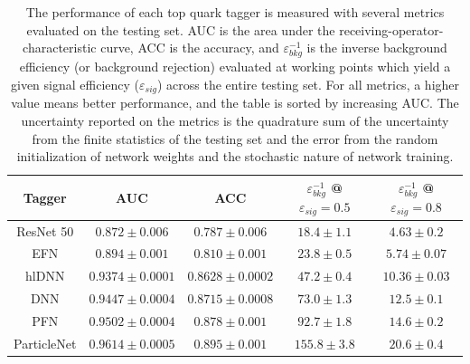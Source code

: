 \begin{table}[]
    \centering
    \caption{The performance of each top quark tagger is measured with several metrics evaluated on the testing set. AUC is the area under the receiving-operator-characteristic curve, ACC is the accuracy, and $\varepsilon^{-1}_{bkg}$ is the inverse background efficiency (or background rejection) evaluated at working points which yield a given signal efficiency ($\varepsilon_{sig}$) across the entire testing set. For all metrics, a higher value means better performance, and the table is sorted by increasing AUC. The uncertainty reported on the metrics is the quadrature sum of the uncertainty from the finite statistics of the testing set and the error from the random initialization of network weights and the stochastic nature of network training.}
    \begin{tabular}{c|c|c|c|c}
        \hline \hline
        Tagger & AUC & ACC & $\varepsilon^{-1}_{bkg}$ @ $\varepsilon_{sig} = 0.5$ & $\varepsilon^{-1}_{bkg}$ @ $\varepsilon_{sig} = 0.8$ \\ \hline
        ResNet 50 & $0.872 \pm 0.006$ & $0.787 \pm 0.006$ & $18.4 \pm 1.1$ & $4.63 \pm 0.2$ \\ 
        EFN & $0.894 \pm 0.001$ & $0.810 \pm 0.001$ & $23.8 \pm 0.5$ & $5.74 \pm 0.07$ \\  
        hlDNN & $0.9374 \pm 0.0001$ & $0.8628 \pm 0.0002$ & $47.2 \pm 0.4$ & $10.36 \pm 0.03$ \\ 
        DNN & $0.9447 \pm 0.0004$ & $0.8715 \pm 0.0008$ & $73.0 \pm 1.3$ & $12.5 \pm 0.1$ \\
        PFN & $0.9502 \pm 0.0004$ & $0.878 \pm 0.001$ & $92.7 \pm 1.8$ & $14.6 \pm 0.2$ \\ 
        ParticleNet & $0.9614 \pm 0.0005$ & $0.895 \pm 0.001$ & $155.8 \pm 3.8$ & $20.6 \pm 0.4$ \\ \hline \hline
    \end{tabular}
    \label{tab:performance_numbers}
\end{table}
